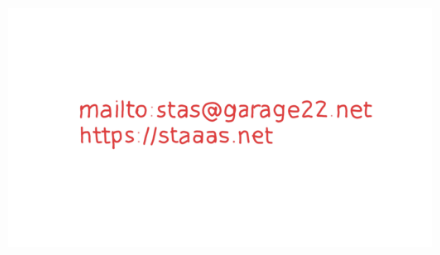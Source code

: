\documentclass[10pt,pdf,utf8,aspectratio=169,xcolor=dvipsnames,x11names,center]{beamer}
\begin{document}
\begin{frame}
  \begin{figure}
    \includegraphics[scale=0.88]{Slides-06-contacts}
  \end{figure}
\end{frame}
\end{document}
